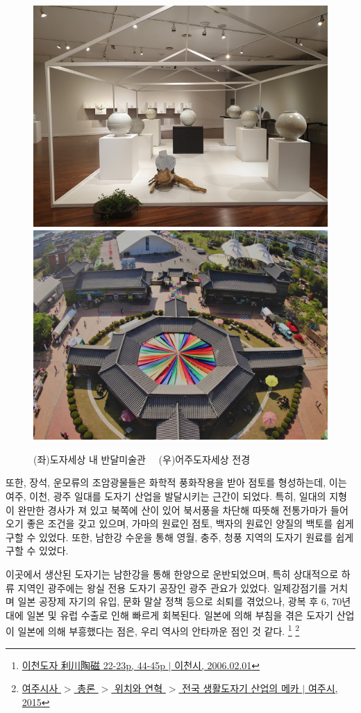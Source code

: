  \begin{figure}[ht]
    \centering
    \includegraphics[width=.4\textwidth]{img/도자전.jpg}
    \includegraphics[width=.4\textwidth]{img/여주도자세상.jpg}
    \caption{(좌)도자세상 내 반달미술관\protect\footnotemark $\quad$ (우)어주도자세상 전경\protect\footnotemark}
    \label{fig:my_labe3}
\end{figure}

또한, 장석, 운모류의 조암광물들은 화학적 풍화작용을 받아 점토를 형성하는데,
이는 여주, 이천, 광주 일대를 도자기 산업을 발달시키는 근간이 되었다.
특히, 일대의 지형이 완만한 경사가 져 있고
북쪽에 산이 있어 북서풍을 차단해 따뜻해 전통가마가 들어오기 좋은 조건을 갖고 있으며,
가마의 원료인 점토, 백자의 원료인 양질의 백토를 쉽게 구할 수 있었다.
또한, 남한강 수운을 통해 영월, 충주, 청풍 지역의 도자기 원료를 쉽게 구할 수 있었다.

이곳에서 생산된 도자기는 남한강을 통해 한양으로 운반되었으며,
특히 상대적으로 하류 지역인 광주에는 왕실 전용 도자기 공장인 광주 관요가 있었다.
일제강점기를 거치며 일본 공장제 자기의 유입, 문화 말살 정책 등으로 쇠퇴를 겪었으나,
광복 후 6, 70년대에 일본 및 유럽 수출로 인해 빠르게 회복된다.
일본에 의해 부침을 겪은 도자기 산업이 일본에 의해 부흥했다는 점은, 우리 역사의 안타까운 점인 것 같다.
\footnote{\href{https://memory.library.kr/items/show/37951}{이천도자 利川陶磁 22-23p, 44-45p $|$ 이천시, 2006.02.01}}
\footnote{ \href{https://www.yeoju.go.kr/history/main.jsp}{여주시사 $>$ 총론 $>$ 위치와 연혁 $>$ 전국 생활도자기 산업의 메카 $|$ 여주시, 2015}}

